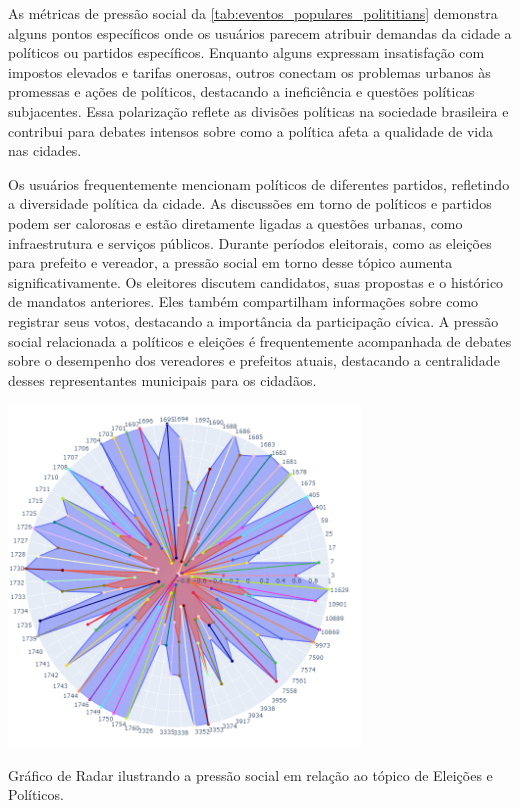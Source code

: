 As métricas de pressão social da \autoref{tab:eventos_populares_polititians} demonstra alguns pontos específicos onde os usuários parecem atribuir demandas da cidade a políticos ou partidos específicos. Enquanto alguns expressam insatisfação com impostos elevados e tarifas onerosas, outros conectam os problemas urbanos às promessas e ações de políticos, destacando a ineficiência e questões políticas subjacentes. Essa polarização reflete as divisões políticas na sociedade brasileira e contribui para debates intensos sobre como a política afeta a qualidade de vida nas cidades.

Os usuários frequentemente mencionam políticos de diferentes partidos, refletindo a diversidade política da cidade. As discussões em torno de políticos e partidos podem ser calorosas e estão diretamente ligadas a questões urbanas, como infraestrutura e serviços públicos. Durante períodos eleitorais, como as eleições para prefeito e vereador, a pressão social em torno desse tópico aumenta significativamente. Os eleitores discutem candidatos, suas propostas e o histórico de mandatos anteriores. Eles também compartilham informações sobre como registrar seus votos, destacando a importância da participação cívica. A pressão social relacionada a políticos e eleições é frequentemente acompanhada de debates sobre o desempenho dos vereadores e prefeitos atuais, destacando a centralidade desses representantes municipais para os cidadãos.

\begin{quadro}[htb]
	\centering
	\includegraphics[width=0.7\textwidth]{images/social_barometer_polititians.png}
	\caption{Gráfico de Radar ilustrando a pressão social em relação ao tópico de Eleições e Políticos.}
	\label{fig:social_barometer_polititians}
\end{quadro}

